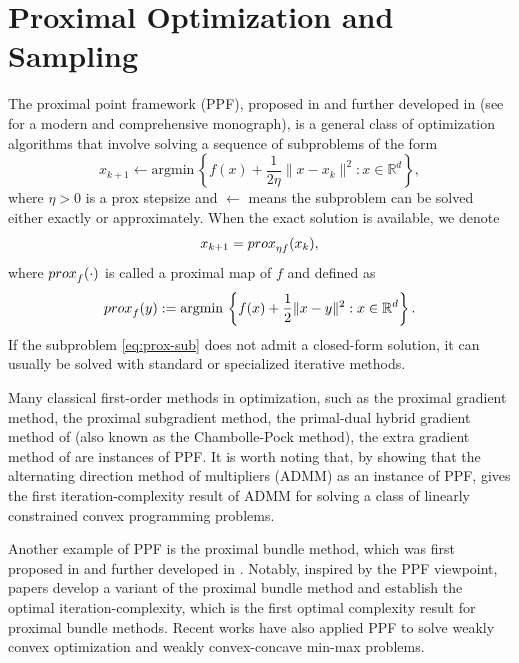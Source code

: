 \documentclass[11pt,letterpaper]{article}
\newcommand{\R}{\mathbb{R}}
\newcommand{\argmin}{\mathrm{argmin}\,}
\begin{document}
\section{Proximal Optimization and Sampling}

The proximal point framework (PPF), proposed in \cite{martinet1970regularisation} and further developed in \cite{MR0418919,rockafellar1976monotone} (see \cite{ParBoy14} for a modern and comprehensive monograph), is a general class of optimization algorithms that involve solving a sequence of subproblems of the form
\begin{equation}\label{eq:prox-sub}
    x_{k+1} \leftarrow \argmin \left\{f(x)+\frac{1}{2\eta}\|x-x_{k}\|^2: x\in \R^d\right\},
\end{equation}
where $\eta>0$ is a prox stepsize and $\leftarrow$ means the subproblem can be solved either exactly or approximately. When the exact solution is available, we denote 
\[
x_{k+1} = {\rm prox}_{\eta f}(x_k),
\]
where ${\rm prox}_{f}(\cdot)$ is called a proximal map of $f$ and defined as
\begin{equation}\label{def:prox-map}
    {\rm prox}_{f}(y): = \argmin \left\{f(x)+\frac{1}{2}\|x-y\|^2: x\in \R^d\right\}.
\end{equation}
If the subproblem \eqref{eq:prox-sub} does not admit a closed-form solution, it can usually be solved with standard or specialized iterative methods.

Many classical first-order methods in optimization, such as the proximal gradient method, the proximal subgradient method, the primal-dual hybrid gradient method of \cite{chambolle2011first} (also known as the Chambolle-Pock method), the extra gradient method of \cite{MR0451121}
are instances of PPF.
It is worth noting that, by showing that the alternating direction method of multipliers (ADMM) as an instance of PPF, \cite{monteiro2010iteration} gives the first iteration-complexity result of ADMM for solving a class of linearly constrained convex programming problems.

Another example of PPF is the proximal bundle method, which was first proposed in \cite{lemarechal1975extension,lemarechal1978nonsmooth,mifflin1982modification,wolfe1975method} and further developed in \cite{diaz2023optimal,du2017rate,frangioni2002generalized,kiwiel2000efficiency,liang2024unified,liang2020proximal,de2014convex,ruszczynski2011nonlinear,van2017probabilistic}. Notably, inspired by the PPF viewpoint, papers \cite{liang2024unified,liang2020proximal} develop a variant of the proximal bundle method and establish the optimal iteration-complexity, which is the first optimal complexity result for proximal bundle methods.
Recent works \cite{kong2019complexity,jliang2018double,kong2021accelerated,liang2023proximal} have also applied PPF to solve weakly convex optimization and weakly convex-concave min-max problems.
\end{document}
